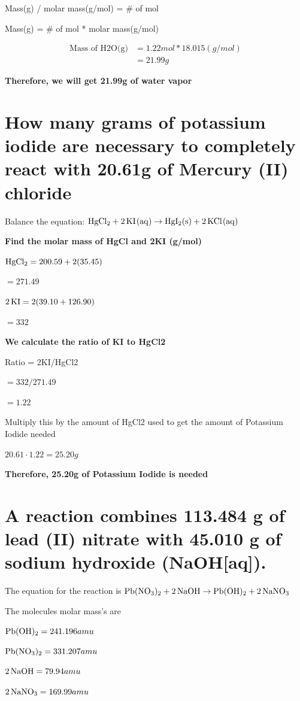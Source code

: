 \documentclass{scrartcl}
\begin{document}
Mass(g) / molar mass(g/mol) = \# of mol

Mass(g) = \# of mol * molar mass(g/mol)

\begin{align*}
\text{Mass of H2O(g)}&=1.22mol * 18.015(g/mol)\\
&= 21.99g
\end{align*}

\textbf{Therefore, we will get 21.99g of water vapor}

\section{How many grams of potassium iodide are necessary to completely react with 20.61g of Mercury (II) chloride}
\label{sec:org3b63d1c}
Balance the equation:
\(\ce{HgCl2 + 2KI(aq)} \rightarrow \ce{HgI2(s) + 2KCl(aq)}\)

\textbf{Find the molar mass of HgCl and 2KI (g/mol)}

\(\ce{HgCl2} = 200.59 + 2(35.45)\)

\(= 271.49\)

\(\ce{2KI} = 2(39.10 + 126.90)\)

\(= 332\)

\textbf{We calculate the ratio of KI to HgCl2}

Ratio = 2KI/HgCl2

\(= 332/271.49\)

\(= 1.22\)

Multiply this by the amount of HgCl2 used to get the amount of Potassium Iodide
needed

\(20.61 \cdot 1.22 = 25.20g\)

\textbf{Therefore, 25.20g of Potassium Iodide is needed}

\section{A reaction combines 113.484 g of lead (II) nitrate with 45.010 g of sodium hydroxide (NaOH[aq]).}
\label{sec:org76eba5a}
The equation for the reaction is
\(\ce{Pb(NO3)2}+\ce{2NaOH}\rightarrow\ce{Pb(OH)2}+\ce{2NaNO3}\)

The molecules molar mass's are

\(\ce{Pb(OH)2}=241.196 amu\)

\(\ce{Pb(NO3)2}=331.207 amu\)

\(\ce{2NaOH}=79.94 amu\)

\(\ce{2NaNO3}=169.99 amu\)
\end{document}
